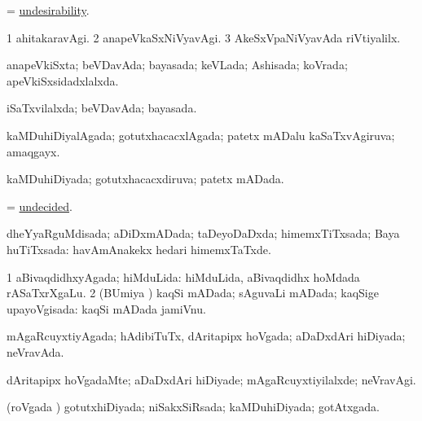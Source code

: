 \bentry
{} 
\gl{\nA}
\expl{}
\bmng
 = \hyperlink{undesirability}{undesirability}. 
\emng
\eentry

\bentry
{} 
\gl{\kirxvi}
\expl{}
\bmng
\bnum
\num{1} ahitakaravAgi. 
\num{2} anapeVkaSxNiVyavAgi. 
\num{3} AkeSxVpaNiVyavAda riVtiyalilx. 
\enum
\emng
\eentry

\bentry
{} 
\gl{\gu}
\expl{}
\bmng
 anapeVkiSxta; beVDavAda; bayasada; keVLada; Ashisada; koVrada; apeVkiSxsidadxlalxda. 
\emng
\eentry

\bentry
{} 
\gl{\gu}
\expl{}
\bmng
 iSaTxvilalxda; beVDavAda; bayasada. 
\emng
\eentry

\bentry
{} 
\gl{\gu}
\expl{}
\bmng
 kaMDuhiDiyalAgada; gotutxhacacxlAgada; patetx mADalu kaSaTxvAgiruva; amaqgayx. 
\emng
\eentry

\bentry
{} 
\gl{\gu}
\expl{}
\bmng
 kaMDuhiDiyada; gotutxhacacxdiruva; patetx mADada. 
\emng
\eentry

\bentry
{} 
\gl{\gu}
\expl{}
\bmng
 = \hyperlink{undecided}{undecided}. 
\emng
\eentry

\bentry
{} 
\gl{\gu}
\expl{}
\bmng
 dheYyaRguMdisada; aDiDxmADada; taDeyoDaDxda; himemxTiTxsada; Baya huTiTxsada:  havAmAnakekx hedari himemxTaTxde. 
\emng
\eentry

\bentry
{} 
\gl{\gu}
\expl{}
\bmng
\bnum
\num{1} aBivaqdidhxyAgada; hiMduLida:  hiMduLida, aBivaqdidhx hoMdada rASaTxrXgaLu. 
\num{2} (BUmiya \vi) kaqSi mADada; sAguvaLi mADada; kaqSige upayoVgisada:  kaqSi mADada jamiVnu. 
\enum
\emng
\eentry

\bentry
{} 
\gl{\gu}
\expl{}
\bmng
 mAgaRcuyxtiyAgada; hAdibiTuTx, dAritapipx hoVgada; aDaDxdAri hiDiyada; neVravAda. 
\emng
\eentry

\bentry
{} 
\gl{\kirxvi}
\expl{}
\bmng
 dAritapipx hoVgadaMte; aDaDxdAri hiDiyade; mAgaRcuyxtiyilalxde; neVravAgi. 
\emng
\eentry

\bentry
{} 
\gl{\gu}
\expl{}
\bmng
(roVgada \vi) gotutxhiDiyada; niSakxSiRsada; kaMDuhiDiyada; gotAtxgada. 
\emng
\eentry

